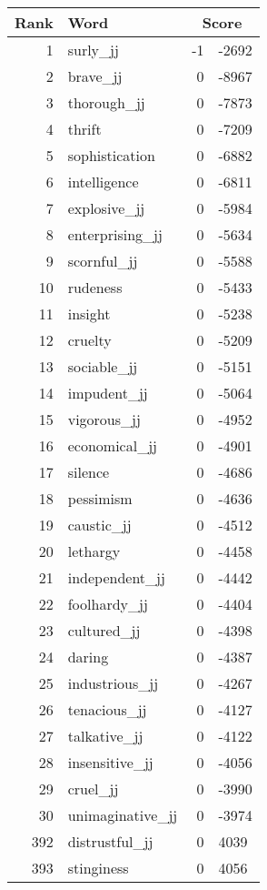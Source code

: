 \begin{longtable}[!htbp]{| rlr@{.}l |}
    \hline
    \textbf{Rank} & \textbf{Word} & \multicolumn{2}{c|}{\textbf{Score}} \\
    \hline
    \endhead
    1 & surly\_jj & -1 & -2692 \\
    2 & brave\_jj & 0 & -8967 \\
    3 & thorough\_jj & 0 & -7873 \\
    4 & thrift & 0 & -7209 \\
    5 & sophistication & 0 & -6882 \\
    6 & intelligence & 0 & -6811 \\
    7 & explosive\_jj & 0 & -5984 \\
    8 & enterprising\_jj & 0 & -5634 \\
    9 & scornful\_jj & 0 & -5588 \\
    10 & rudeness & 0 & -5433 \\
    11 & insight & 0 & -5238 \\
    12 & cruelty & 0 & -5209 \\
    13 & sociable\_jj & 0 & -5151 \\
    14 & impudent\_jj & 0 & -5064 \\
    15 & vigorous\_jj & 0 & -4952 \\
    16 & economical\_jj & 0 & -4901 \\
    17 & silence & 0 & -4686 \\
    18 & pessimism & 0 & -4636 \\
    19 & caustic\_jj & 0 & -4512 \\
    20 & lethargy & 0 & -4458 \\
    21 & independent\_jj & 0 & -4442 \\
    22 & foolhardy\_jj & 0 & -4404 \\
    23 & cultured\_jj & 0 & -4398 \\
    24 & daring & 0 & -4387 \\
    25 & industrious\_jj & 0 & -4267 \\
    26 & tenacious\_jj & 0 & -4127 \\
    27 & talkative\_jj & 0 & -4122 \\
    28 & insensitive\_jj & 0 & -4056 \\
    29 & cruel\_jj & 0 & -3990 \\
    30 & unimaginative\_jj & 0 & -3974 \\
    392 & distrustful\_jj & 0 & 4039 \\
    393 & stinginess & 0 & 4056 \\

\end{longtable}
